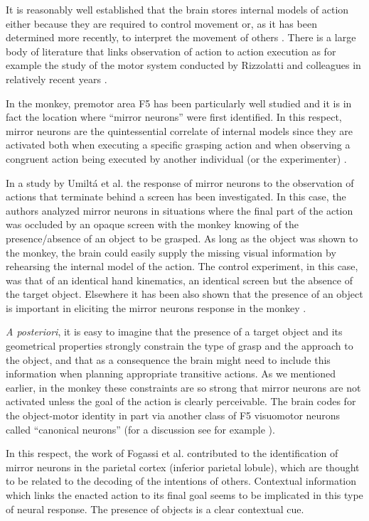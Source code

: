 It is reasonably well established that the brain stores internal models of action
either because they are required to control movement or, as it has been determined
more recently, to interpret the movement of others \cite{kawato-99}. There is a large body of 
literature that links observation of action to action execution as for 
example the study of the motor system conducted by Rizzolatti and colleagues in 
relatively recent years \cite{rizzolatti-04,gallese-96,rizzolatti-01}. 

In the monkey, premotor area F5 has been particularly well studied and it is in fact the 
location where ``mirror neurons'' were first identified. In this respect, mirror neurons 
are the quintessential correlate of internal models since they are activated 
both when executing a specific grasping action and when observing a congruent action 
being executed by another individual (or the experimenter) \cite{fadiga-00}.

In a study by Umilt\'a et al. \cite{umilta-01} the response of mirror neurons to the observation of
actions that terminate behind a screen has been investigated. In this case, the authors analyzed 
mirror neurons in situations where the final part of the action was occluded by an opaque 
screen with the monkey knowing of the presence/absence of an object to be grasped. As long
as the object was shown to the monkey, the brain could easily supply the missing
visual information by rehearsing the internal model of the action. The control experiment, in this case, was that
of an identical hand kinematics, an identical screen but the absence of the target object.
Elsewhere it has been also shown that the presence of an object is important in eliciting the 
mirror neurons response in the monkey \cite{gallese-96}.

{\em A posteriori}, it is easy to imagine that the presence of a target object and its geometrical 
properties strongly constrain the type of grasp and the approach to the object, and that as a consequence 
the brain might need to include this information when planning appropriate transitive actions. 
As we mentioned earlier, in the monkey these constraints are so strong that mirror neurons are not 
activated unless the goal of the action is clearly perceivable. The brain codes for the object-motor 
identity in part via another class of F5 visuomotor neurons called ``canonical neurons'' (for a 
discussion see for example \cite{metta-06}). 

In this respect, the work of Fogassi et al. \cite{fogassi-05} contributed to the identification of mirror
neurons in the parietal cortex (inferior parietal lobule), which are thought to be related to the 
decoding of the intentions of others. Contextual information which links the enacted action to its
final goal seems to be implicated in this type of neural response. The presence of objects is 
a clear contextual cue.

